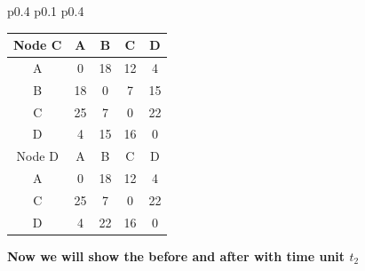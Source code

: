 \documentclass{article}
\begin{document}
\begin{tabular}{p{0.4\linewidth} p{0.1\linewidth} p{0.4\linewidth}}
\begin{tabular}{c|c|c|c|c}
    \hline
    \hline
    Node C & A & B & C & D \\
    \hline
    A & 0 & 18 & 12 & 4 \\
    B & 18 & 0 & 7 & 15 \\
    C & \color{red}25 & 7 & 0 & 22 \\
    D & 4 & 15 & 16 & 0 \\
    \hline
    \hline
    Node D & A & B & C & D \\
    \hline
    A & 0 & 18 & 12 & 4 \\
    C & 25 & 7 & 0 & 22 \\
    D & 4 & \color{red}22 & 16 & 0 \\
    \hline
\end{tabular}
\end{tabular}

\textbf{Now we will show the before and after with time unit $t_2$}\\
\newline
\end{document}
